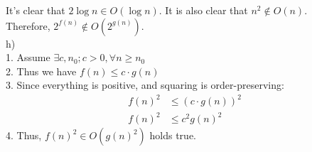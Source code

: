 \documentclass[12pt]{report}
\newcommand{\no}{\noindent}
\begin{document}
	It's clear that $2\log{n} \in O(\log{n})$. It is also clear that $n^2 \notin O(n)$.\\
	Therefore, $2^{f(n)} \notin O(2^{g(n)})$.\\
	
	\no h) 	\\
	1. Assume $\exists c, n_0; c > 0, \forall n \geq n_0$\\
	2. Thus we have $f(n) \leq c \cdot g(n)$ \\
	3. Since everything is positive, and squaring is order-preserving:
	\begin{align*}
	f(n)^2 &\leq (c\cdot g(n))^2\\
	f(n)^2 &\leq c^2g(n)^2
	\end{align*}
	4. Thus, $f(n)^2 \in O(g(n)^2)$ holds true.
\end{document}
